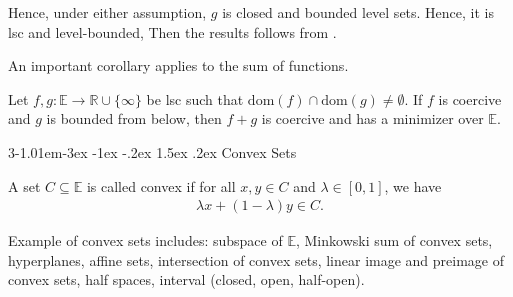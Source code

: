\documentclass{tufte-handout}
\makeatletter
\renewcommand{\section}{\@startsection{section}%
    {3}{-1.01em}{-3ex \@plus -1ex \@minus -.2ex}%
    {1.5ex \@plus .2ex}
    {\hspace*{-5.5em}\fcolorbox{blue}{blue}{\parbox[c][1.0ex][b]{4em}{\phantom{space}}}
    \normalfont\Large\itshape\color{blue}}}
\makeatother
\begin{document}
Hence, under either assumption, \( g \) is closed and bounded level sets.
Hence, it is lsc and level-bounded, Then the results follows from .
\hfill\qedsymbol

An important corollary applies to the sum of functions.
\begin{Corollary}
    Let \( f, g:\mathbb{E}\to \mathbb{R}\cup \{\infty\} \) be lsc such that \( \text{dom}(f) \cap \text{dom}(g) \neq \emptyset \).
    If \( f \) is coercive and \( g \) is bounded from below, 
    then \( f + g \) is coercive and has a minimizer over \( \mathbb{E} \).
\end{Corollary}


\clearpage
\section{Convex Sets}
\begin{Definition}
    A set \( C \subseteq \mathbb{E} \) is called convex if for all \( x, y \in C \) and \( \lambda \in [0, 1] \), we have
    \begin{align}
    \lambda x + (1-\lambda) y \in C.
    \end{align}
\end{Definition}
Example of convex sets includes:
subspace of \( \mathbb{E} \), Minkowski sum of convex sets, hyperplanes, 
affine sets, intersection of convex sets, linear image and 
preimage of convex sets, half spaces, interval (closed, open, half-open).

\end{document}
